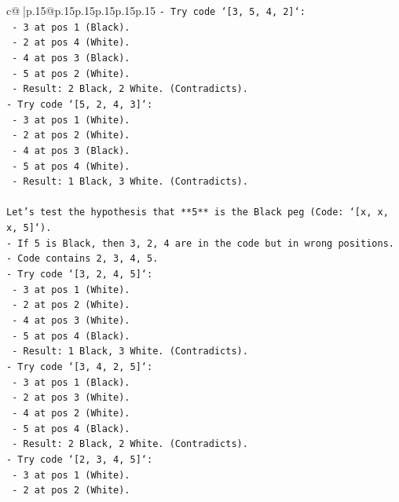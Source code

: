 \documentclass{article}
\begin{document}
{\begin{supertabular}{c@{$\;$}|p{.15\linewidth}@{}p{.15\linewidth}p{.15\linewidth}p{.15\linewidth}p{.15\linewidth}p{.15\linewidth}}
{{{\texttt{{-} Try code `{[}3, 5, 4, 2{]}`:} \\
\texttt{  {-} 3 at pos 1 (Black).} \\
\texttt{  {-} 2 at pos 4 (White).} \\
\texttt{  {-} 4 at pos 3 (Black).} \\
\texttt{  {-} 5 at pos 2 (White).} \\
\texttt{  {-} Result: 2 Black, 2 White. (Contradicts).} \\
\texttt{{-} Try code `{[}5, 2, 4, 3{]}`:} \\
\texttt{  {-} 3 at pos 1 (White).} \\
\texttt{  {-} 2 at pos 2 (White).} \\
\texttt{  {-} 4 at pos 3 (Black).} \\
\texttt{  {-} 5 at pos 4 (White).} \\
\texttt{  {-} Result: 1 Black, 3 White. (Contradicts).} \\
\\ 
\texttt{Let's test the hypothesis that **5** is the Black peg (Code: `{[}x, x, x, 5{]}`).} \\
\texttt{{-} If 5 is Black, then 3, 2, 4 are in the code but in wrong positions.} \\
\texttt{{-} Code contains 2, 3, 4, 5.} \\
\texttt{{-} Try code `{[}3, 2, 4, 5{]}`:} \\
\texttt{  {-} 3 at pos 1 (White).} \\
\texttt{  {-} 2 at pos 2 (White).} \\
\texttt{  {-} 4 at pos 3 (White).} \\
\texttt{  {-} 5 at pos 4 (Black).} \\
\texttt{  {-} Result: 1 Black, 3 White. (Contradicts).} \\
\texttt{{-} Try code `{[}3, 4, 2, 5{]}`:} \\
\texttt{  {-} 3 at pos 1 (Black).} \\
\texttt{  {-} 2 at pos 3 (White).} \\
\texttt{  {-} 4 at pos 2 (White).} \\
\texttt{  {-} 5 at pos 4 (Black).} \\
\texttt{  {-} Result: 2 Black, 2 White. (Contradicts).} \\
\texttt{{-} Try code `{[}2, 3, 4, 5{]}`:} \\
\texttt{  {-} 3 at pos 1 (White).} \\
\texttt{  {-} 2 at pos 2 (White).} \\
}}}
\end{supertabular}}
\end{document}
